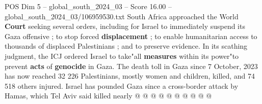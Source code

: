 \begin{textsample}{POS Dim 5 – global\_south\_2024\_03 – Score 16.00 – global\_south\_2024\_03/106959530.txt}
South Africa approached the World \textbf{Court} seeking several orders, including for Israel to immediately suspend its Gaza offensive ; to stop forced \textbf{displacement} ; to enable humanitarian access to thousands of displaced Palestinians ; and to preserve evidence.
In its scathing judgment, the ICJ ordered Israel to take"all \textbf{measures} within its power"to prevent \textbf{acts} of \textbf{genocide} in Gaza.
The death toll in Gaza since 7 October, 2023 has now reached 32 226 Palestinians, mostly women and children, killed, and 74 518 others injured.
Israel has pounded Gaza since a cross-border attack by Hamas, which Tel Aviv said killed nearly @ @ @ @ @ @ @ @ @ @

\end{textsample}
